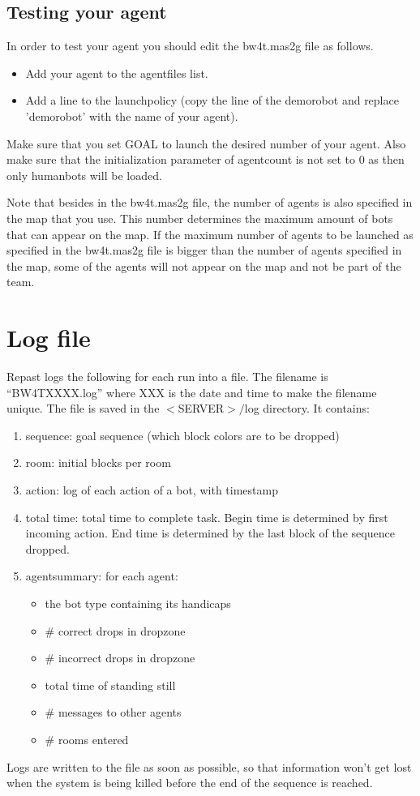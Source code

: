\documentclass[11pt,a4paper]{article}
\begin{document}
\subsection{Testing your agent}
In order to test your agent you should edit the bw4t.mas2g file as follows.
\begin{itemize}
\item Add your agent to the agentfiles list.
\item Add a line to the launchpolicy (copy the line of the demorobot and replace 'demorobot' with the name of your agent).
\end{itemize}
Make sure that you set GOAL to launch the desired number of your agent. Also make sure that the initialization parameter of agentcount is not set to 0 as then only humanbots will be loaded.

Note that besides in the bw4t.mas2g file, the number of agents is also specified in the map that you use. This number determines the maximum amount of bots that can appear on the map. If the maximum number of agents to be launched as specified in the bw4t.mas2g file is bigger than the number of agents specified in the map, some of the agents will not appear on the map and not be part of the team. 


\section{Log file}
Repast logs the following for each run into a file. The filename is “BW4TXXXX.log” where XXX is the date and time to make the filename unique. The file is saved in the $<$SERVER$>/$log directory. It contains:
\begin{enumerate}
\item sequence: goal sequence (which block colors are to be dropped)
\item room: initial blocks per room
\item action: log of each action of a bot, with timestamp 
\item total time: total time to complete task. Begin time is determined by first incoming action. End time is determined by the last block of the sequence dropped.
\item agentsummary: for each agent:
    \begin{itemize}
    \item the bot type containing its handicaps
    \item \# correct drops in dropzone
    \item \# incorrect drops in dropzone
    \item total time of standing still
    \item \# messages to other agents
    \item \# rooms entered
    \end{itemize}
\end{enumerate}
Logs are written to the file as soon as possible, so that information won't get lost when the system is being killed before the end of the sequence is reached.




\end{document}
